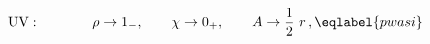 \begin{equation}
{\rm UV:}\qquad\qquad \rho\to 1_-,\qquad \chi\to 0_+,\qquad A\to \frac 12\ 
r\,, 
\eqlabel{pwasi}
\end{equation} 
